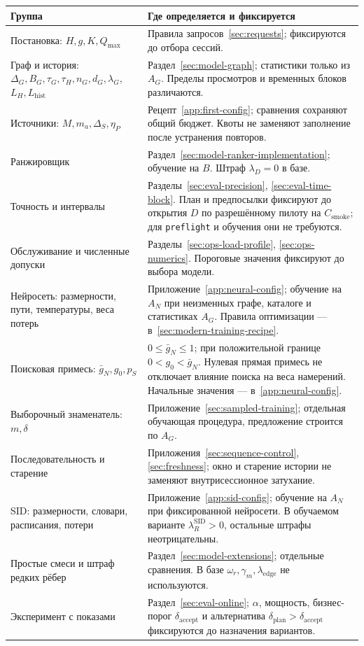 \documentclass[12pt,a4paper]{article}
\newcommand{\code}[1]{{\ttfamily\small\nolinkurl{#1}}}
\theoremstyle{plainru}
\begin{document}
\begin{longtable}{L{0.34\textwidth}L{0.57\textwidth}}
\toprule Группа & Где определяется и фиксируется \\\midrule\endhead
Постановка: $H,g,K,Q_{\max}$ &
Правила запросов~\ref{sec:requests}; фиксируются до отбора сессий. \\
Граф и история: $\Delta_G,B_G,\tau_G,\tau_H,n_G,d_G,\lambda_G$,
$L_H,L_{\mathrm{hist}}$ &
Раздел~\ref{sec:model-graph}; статистики только из $A_G$.
Пределы просмотров и временных блоков различаются. \\
Источники: $M,m_a,\Delta_S,\eta_P$ &
Рецепт~\ref{app:first-config}; сравнения сохраняют общий бюджет.
Квоты не заменяют заполнение после устранения повторов. \\
Ранжировщик &
Раздел~\ref{sec:model-ranker-implementation}; обучение на $B$.
Штраф $\lambda_D=0$ в базе. \\
Точность и интервалы &
Разделы~\ref{sec:eval-precision}, \ref{sec:eval-time-block}.
План и предпосылки фиксируют до открытия $D$ по разрешённому пилоту
на $C_{\mathrm{smoke}}$; для \code{preflight} и обучения они не требуются. \\
Обслуживание и численные допуски &
Разделы~\ref{sec:ops-load-profile}, \ref{sec:ops-numerics}.
Пороговые значения фиксируют до выбора модели. \\
Нейросеть: размерности, пути, температуры, веса потерь &
Приложение~\ref{app:neural-config}; обучение на $A_N$ при
неизменных графе, каталоге и статистиках $A_G$.
Правила оптимизации --- в~\ref{sec:modern-training-recipe}. \\
Поисковая примесь: $\bar g_N,g_0,p_S$ &
$0\le\bar g_N\le1$; при положительной границе
$0<g_0<\bar g_N$. Нулевая прямая примесь не отключает влияние поиска
на веса намерений. Начальные значения --- в~\ref{app:neural-config}. \\
Выборочный знаменатель: $m,\delta$ &
Приложение~\ref{sec:sampled-training}; отдельная обучающая процедура,
предложение строится по $A_G$. \\
Последовательность и старение &
Приложения~\ref{sec:sequence-control}, \ref{sec:freshness};
окно и старение истории не заменяют внутрисессионное затухание. \\
SID: размерности, словари, расписания, потери &
Приложение~\ref{app:sid-config}; обучение на $A_N$ при
фиксированной нейросети. В обучаемом варианте
$\lambda_R^{\mathrm{SID}}>0$, остальные штрафы неотрицательны. \\
Простые смеси и штраф редких рёбер &
Раздел~\ref{sec:model-extensions}; отдельные сравнения.
В базе $\omega_r,\gamma_m,\lambda_{\mathrm{edge}}$ не используются. \\
Эксперимент с показами &
Раздел~\ref{sec:eval-online}; $\alpha$, мощность, бизнес-порог
$\delta_{\mathrm{accept}}$ и альтернатива
$\delta_{\mathrm{plan}}>\delta_{\mathrm{accept}}$
фиксируются до назначения вариантов. \\
\bottomrule
\end{longtable}
\end{document}

